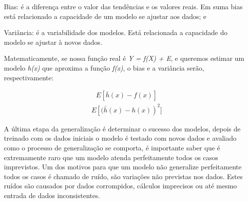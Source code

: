 \begin{alineas}
	\item Bias: é a diferença entre o valor das tendências e os valores reais. Em suma bias está relacionado a capacidade de um modelo
				se ajustar aos dados; e
	\item Variância: é a variabilidade dos modelos. Está relacionada a capacidade do modelo se ajustar à novos dados.  
\end{alineas}   

Matematicamente, se nossa função real é \textit{Y = f(X) + E}, e queremos estimar um modelo \textit{h(x)} que aproxima a função \textit{f(x)},
o bias e a variância serão, respectivamente:

\begin{equation}
	\begin{aligned}
 			E\left [ \bar{h}(x)- f(x) \right  ]
	\end{aligned}	
\end{equation}
\begin{equation}
	\begin{aligned}
 			E\left [ (\bar{h}(x)- h(x) \right)^2 ]
	\end{aligned}
\end{equation}

A última etapa da generalização é determinar o sucesso dos modelos, depois de treinado com os dados iniciais
o modelo é testado com novos dados e avaliado como o processo de generalização se comporta, é importante saber que é extremamente raro
que um modelo atenda perfeitamente todos os casos imprevistos.
Um dos motivos para que um modelo não generalize perfeitamente todos os casos é chamado de ruído, são variações não previstas nos dados.
Estes ruídos são causados por dados corrompidos, cálculos imprecisos ou até mesmo entrada de dados inconsistentes.









 
